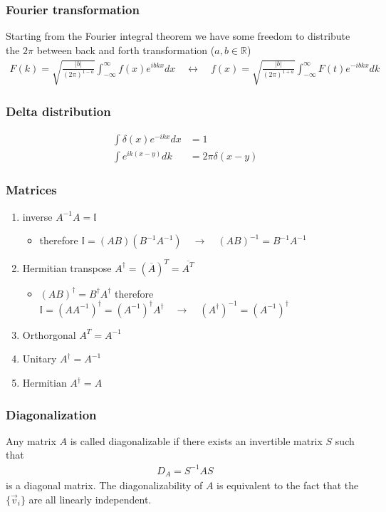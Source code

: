 \documentclass[10pt,a4paper]{article}
\theoremstyle{definition}
\begin{document}
\subsubsection{Fourier transformation}
Starting from the Fourier integral theorem we have some freedom to distribute the $2\pi$ between back and forth transformation ($a,b\in\mathbb{R}$)
\begin{align}
    F(k)=\sqrt{\frac{|b|}{(2\pi)^{1-a}}}\int_{-\infty}^\infty f(x)e^{ibkx}dx\quad\leftrightarrow\quad f(x)=\sqrt{\frac{|b|}{(2\pi)^{1+a}}}\int_{-\infty}^\infty F(t)e^{-ibkx}dk
\end{align}

\subsubsection{Delta distribution}
\begin{align}
    \int\delta(x)e^{-ikx}dx&=1\\
    \int e^{ik(x-y)}dk&=2\pi\delta(x-y)
\end{align}

\subsubsection{Matrices}
\begin{enumerate}
    \item inverse $A^{-1}A=\mathbb{I}$
    \begin{itemize}
        \item therefore $\mathbb{I}=(AB)(B^{-1}A^{-1})\quad\rightarrow\quad (AB)^{-1}=B^{-1}A^{-1}$
    \end{itemize}
    \item Hermitian transpose $A^\dagger = (\overline{A})^T = \overline{A^T}$
        \begin{itemize}
        \item $(AB)^\dagger=B^\dagger A^\dagger$ therefore $\mathbb{I}=(AA^{-1})^\dagger=(A^{-1})^\dagger A^\dagger\quad\rightarrow\quad (A^\dagger)^{-1}=(A^{-1})^\dagger$
    \end{itemize}
    \item Orthorgonal $A^T = A^{-1}$
    \item Unitary $A^\dagger = A^{-1}$
    \item Hermitian $A^\dagger = A$
\end{enumerate}

\subsubsection{Diagonalization}
Any  matrix $A$ is called diagonalizable if there exists an invertible matrix $S$ such that
\begin{align}
    D_A=S^{-1}AS
\end{align}
is a diagonal matrix. The diagonalizability of $A$ is equivalent to the fact that the $\{\vec{v}_i\}$ are all linearly independent.
\end{document}
